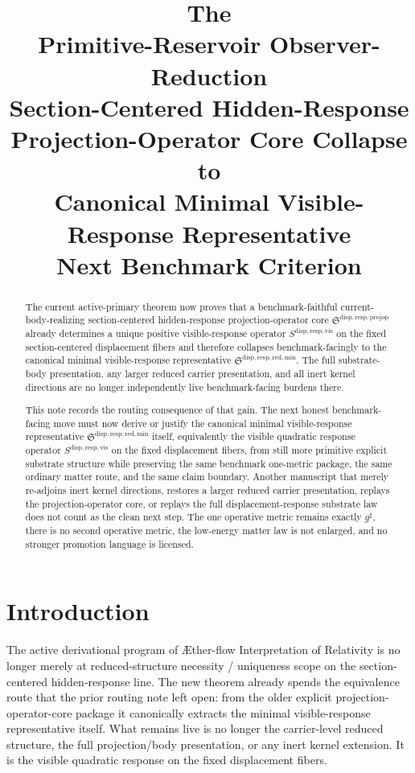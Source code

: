 \documentclass[11pt]{article}
\title{\textbf{The \TheoryName{}}\\[0.4em]
\large Primitive-Reservoir Observer-Reduction\\
\large Section-Centered Hidden-Response\\
\large Projection-Operator Core Collapse to\\
\large Canonical Minimal Visible-Response Representative\\
\large Next Benchmark Criterion}
\author{}
\date{}
\newcommand{\Aflow}{\AE{}ther-flow}
\newcommand{\TheoryName}{\Aflow{} Interpretation of Relativity}
\newcommand{\CompletedMetric}{g^{\sharp}}
\newcommand{\ProjectionOperatorCore}{\mathfrak S^{\mathrm{disp,resp,projop}}}
\newcommand{\MinimalReducedStructure}{\mathfrak S^{\mathrm{disp,resp,red,min}}}
\newcommand{\VisibleResponseOperator}{S^{\mathrm{disp,resp,vis}}}
\begin{document}
\maketitle

\begin{abstract}
The current active-primary theorem now proves that a benchmark-faithful current-body-realizing section-centered hidden-response projection-operator core \(\ProjectionOperatorCore\) already determines a unique positive visible-response operator \(\VisibleResponseOperator\) on the fixed section-centered displacement fibers and therefore collapses benchmark-facingly to the canonical minimal visible-response representative \(\MinimalReducedStructure\). The full substrate-body presentation, any larger reduced carrier presentation, and all inert kernel directions are no longer independently live benchmark-facing burdens there.

This note records the routing consequence of that gain. The next honest benchmark-facing move must now derive or justify the canonical minimal visible-response representative \(\MinimalReducedStructure\) itself, equivalently the visible quadratic response operator \(\VisibleResponseOperator\) on the fixed displacement fibers, from still more primitive explicit substrate structure while preserving the same benchmark one-metric package, the same ordinary matter route, and the same claim boundary. Another manuscript that merely re-adjoins inert kernel directions, restores a larger reduced carrier presentation, replays the projection-operator core, or replays the full displacement-response substrate law does not count as the clean next step. The one operative metric remains exactly \(\CompletedMetric\), there is no second operative metric, the low-energy matter law is not enlarged, and no stronger promotion language is licensed.
\end{abstract}

\section{Introduction}

The active derivational program of \TheoryName{} is no longer merely at reduced-structure necessity / uniqueness scope on the section-centered hidden-response line. The new theorem already spends the equivalence route that the prior routing note left open: from the older explicit projection-operator-core package it canonically extracts the minimal visible-response representative itself. What remains live is no longer the carrier-level reduced structure, the full projection/body presentation, or any inert kernel extension. It is the visible quadratic response on the fixed displacement fibers.
\end{document}
